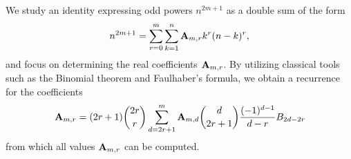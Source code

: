 We study an identity expressing odd powers $n^{2m+1}$ as a double sum of the form
\begin{align*}
    n^{2m+1} = \sum_{r=0}^{m} \sum_{k=1}^{n} {\mathbf{A}} \sb{m,r} k^r (n-k)^r,
\end{align*}
and focus on determining the real coefficients ${\mathbf{A}} \sb{m,r}$.
By utilizing classical tools such as the Binomial theorem and Faulhaber’s formula, we obtain
a recurrence for the coefficients
\begin{align*}
    {\mathbf{A}} \sb{m,r}
    = (2r+1) \binom{2r}{r} \sum_{d = 2r+1}^{m} {\mathbf{A}} \sb{m,d} \binom{d}{2r+1} \frac{(-1)^{d-1}}{d-r} {B}\sb{2d-2r}
\end{align*}
from which all values ${\mathbf{A}} \sb{m,r}$ can be computed.
